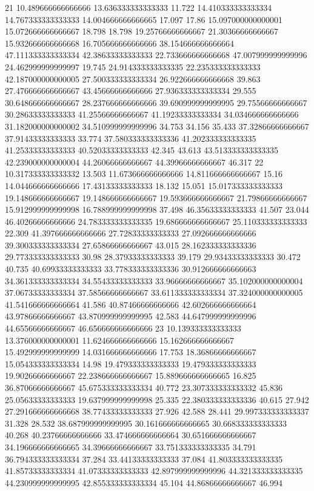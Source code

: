 21 10.489666666666666 13.636333333333333 11.722 14.410333333333334 14.767333333333333 14.004666666666665 17.097 17.86 15.097000000000001 15.072666666666667 18.798 18.798 19.25766666666667 21.30366666666667 15.932666666666668 16.705666666666666 38.154666666666664 47.111333333333334 42.38633333333333 22.733666666666668 47.007999999999996 24.462999999999997 19.745 24.914333333333335 22.235333333333333 42.187000000000005 27.500333333333334 26.922666666666668 39.863 27.476666666666667 43.45666666666666 27.936333333333334 29.555 30.648666666666667 28.237666666666666 39.690999999999995 29.75566666666667 30.28633333333333 41.25566666666667 41.19233333333334 34.034666666666666 31.182000000000002 34.510999999999996 34.753 34.156 35.433 37.32866666666667 37.91433333333333 33.774 37.580333333333336 41.202333333333335 41.25333333333333 40.52033333333333 42.345 43.613 43.513333333333335 42.239000000000004 44.26066666666667 44.39966666666667 46.317
22 10.317333333333332 13.503 11.673666666666666 14.811666666666667 15.16 14.044666666666666 17.43133333333333 18.132 15.051 15.017333333333333 19.148666666666667 19.148666666666667 19.593666666666667 21.79866666666667 15.912999999999998 16.788999999999998 37.498 46.35633333333333 41.507 23.044 46.40266666666666 24.783333333333335 19.686666666666667 25.110333333333333 22.309 41.397666666666666 27.72833333333333 27.092666666666666 39.300333333333334 27.65866666666667 43.015 28.162333333333336 29.773333333333333 30.98 28.37933333333333 39.179 29.93433333333333 30.472 40.735 40.69933333333333 33.778333333333336 30.912666666666663 34.361333333333334 34.55433333333333 33.96666666666667 35.102000000000004 37.06733333333334 37.58566666666667 33.611333333333334 37.324000000000005 41.541666666666664 41.586 40.87466666666666 42.602666666666664 43.97866666666667 43.870999999999995 42.583 44.647999999999996 44.65566666666667 46.656666666666666
23 10.139333333333333 13.376000000000001 11.624666666666666 15.162666666666667 15.492999999999999 14.031666666666666 17.753 18.36866666666667 15.054333333333334 14.98 19.479333333333333 19.479333333333333 19.90266666666667 22.238666666666667 15.889666666666665 16.825 36.87066666666667 45.675333333333334 40.772 23.307333333333332 45.836 25.05633333333333 19.637999999999998 25.335 22.380333333333336 40.615 27.942 27.291666666666668 38.77433333333333 27.926 42.588 28.441 29.997333333333337 31.328 28.532 38.687999999999995 30.161666666666665 30.668333333333333 40.268 40.23766666666666 33.474666666666664 30.651666666666667 34.196666666666665 34.39666666666667 33.751333333333335 34.791 36.794333333333334 37.284 33.44133333333333 37.084 41.803333333333335 41.85733333333334 41.07333333333333 42.897999999999996 44.321333333333335 44.230999999999995 42.855333333333334 45.104 44.86866666666667 46.994
